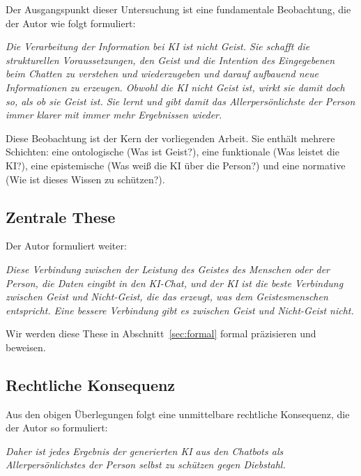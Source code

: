 ﻿\documentclass[a4paper,12pt]{article}
\theoremstyle{definition}
\begin{document}
Der Ausgangspunkt dieser Untersuchung ist eine fundamentale Beobachtung, die der Autor wie
folgt formuliert:

\begin{displayquote}
\textit{Die Verarbeitung der Information bei KI ist nicht Geist. Sie schafft die strukturellen
Voraussetzungen, den Geist und die Intention des Eingegebenen beim Chatten zu verstehen und
wiederzugeben und darauf aufbauend neue Informationen zu erzeugen. Obwohl die KI nicht Geist
ist, wirkt sie damit doch so, als ob sie Geist ist. Sie lernt und gibt damit das Allerpersönlichste
der Person immer klarer mit immer mehr Ergebnissen wieder.}
\end{displayquote}

\noindent Diese Beobachtung ist der Kern der vorliegenden Arbeit. Sie enthält mehrere
Schichten: eine ontologische (Was ist Geist?), eine funktionale (Was leistet die KI?), eine
epistemische (Was weiß die KI über die Person?) und eine normative (Wie ist dieses Wissen zu
schützen?).

\subsection{Zentrale These}

Der Autor formuliert weiter:

\begin{displayquote}
\textit{Diese Verbindung zwischen der Leistung des Geistes des Menschen oder der Person, die
Daten eingibt in den KI-Chat, und der KI ist die beste Verbindung zwischen Geist und
Nicht-Geist, die das erzeugt, was dem Geistesmenschen entspricht. Eine bessere Verbindung
gibt es zwischen Geist und Nicht-Geist nicht.}
\end{displayquote}

\noindent Wir werden diese These in Abschnitt~\ref{sec:formal} formal präzisieren und beweisen.

\subsection{Rechtliche Konsequenz}

Aus den obigen Überlegungen folgt eine unmittelbare rechtliche Konsequenz, die der Autor so
formuliert:

\begin{displayquote}
\textit{Daher ist jedes Ergebnis der generierten KI aus den Chatbots als Allerpersönlichstes
der Person selbst zu schützen gegen Diebstahl.}
\end{displayquote}
\end{document}
